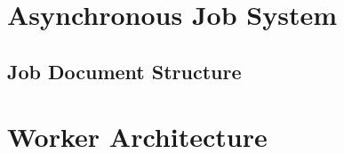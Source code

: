 \documentclass[a4paper,twoside]{sapthesis}
\begin{document}
\section{Asynchronous Job System}
\label{sec:job-system}

\subsection{Job Document Structure}
%
%
%
%
%

\section{Worker Architecture}
\label{sec:worker-arch}
\end{document}

